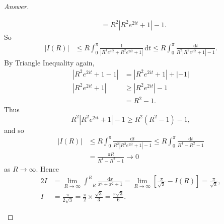\documentclass[12pt]{article}
\newcommand\paren[1]{\left( #1 \right)}
\newcommand{\sqbrack}[1]{\left [ #1 \right ]}
\theoremstyle{definition}
\begin{document}
\begin{proof}[Answer]
\begin{enumerate}[(i)]
\begin{align*}
            & = R^2 \left| R^2 e^{2it} + 1 \right| - 1.
        \end{align*}
        So 
        \begin{align*}
            |I(R)| & \leq R \int_0^{\pi} \frac{1}{ \left| R^4e^{4it} + R^2e^{2it} + 1 \right| } \, \mathrm{d}t \leq R \int_0^{\pi} \frac{ \mathrm{d}t }{ R^2 \left| R^2 e^{2it} + 1 \right| - 1 }. 
        \end{align*}
        By Triangle Inequality again, 
        \begin{align*}
            \left| R^2 e^{2it} + 1 - 1 \right| & = \left| R^2 e^{2it} + 1 \right| + |-1| \\
            \left| R^2 e^{2it} + 1 \right| & \geq \left| R^2 e^{2it} \right| - 1 \\
            & = R^2 - 1.
        \end{align*}
        Thus 
        \[
            R^2 \left| R^2 e^{2it} + 1 \right| - 1 \geq R^2 \paren{ R^2 - 1 } - 1,
        \]
        and so 
        \begin{align*}
            |I(R)| & \leq R \int_0^{\pi} \frac{ \mathrm{d}t }{ R^2 \left| R^2 e^{2it} + 1 \right| - 1 } \leq R \int_0^{\pi} \frac{ \mathrm{d}t }{ R^4 - R^2 - 1 } \\
            & = \frac{\pi R}{R^4 - R^2 - 1} \to 0
        \end{align*}
        as $R \to \infty$. Hence
        \begin{align*}
            2I & = \lim\limits_{R \to \infty} \int_{-R}^{R} \frac{\mathrm{d}x}{x^4 + x^2 + 1} = \lim\limits_{R \to \infty} \sqbrack{ \frac{\pi}{\sqrt{3}} - I(R) } = \frac{\pi}{\sqrt{3}} , \\
            I & = \frac{\pi}{2\sqrt{3}} = \frac{\pi}{2} \times \frac{\sqrt{3}}{3} = \boxed{ \frac{\pi \sqrt{3}}{6} . }
        \end{align*}
    \end{enumerate}
\end{proof}
\end{document}
